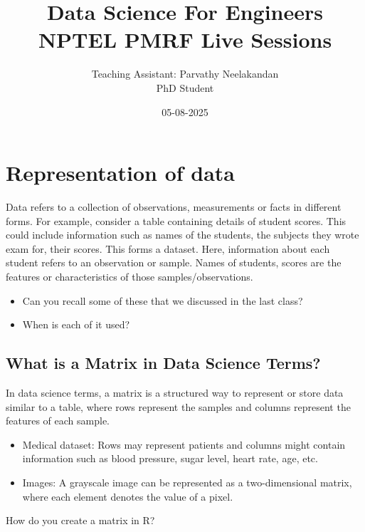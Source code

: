 \documentclass[11pt,a4paper]{article}
\title{\color{blue}Data Science For Engineers\\NPTEL PMRF Live Sessions\\}
\author{Teaching Assistant: Parvathy Neelakandan\\PhD Student}
\date{05-08-2025}
\theoremstyle{definition}
\begin{document}
\maketitle

\section{Representation of data}

Data refers to a collection of observations, measurements or facts in different forms. 
For example, consider a table containing details of student scores. 
This could include information such as names of the students, the subjects they wrote exam for, their scores. 
This forms a dataset. Here, information about each student refers to an observation or sample.
Names of students, scores are the features or characteristics of those samples/observations.

\begin{quesbox}
\begin{itemize}
\item Can you recall some of these that we discussed in the last class?
\item When is each of it used?
\end{itemize}
\end{quesbox}

\subsection{What is a Matrix in Data Science Terms?}

In data science terms, a matrix is a structured way to represent or store data similar to a table, where rows represent the samples and columns represent the features of each sample.

\begin{examplebox}[Examples]
\begin{itemize}
    \item Medical dataset: Rows may represent patients and columns might contain information such as blood pressure, sugar level, heart rate, age, etc.
    \item Images: A grayscale image can be represented as a two-dimensional matrix, where each element denotes the value of a pixel.
\end{itemize}
\end{examplebox}

\begin{quesbox}[Matrix in R]
    How do you create a matrix in R?
\end{quesbox}
\end{document}
